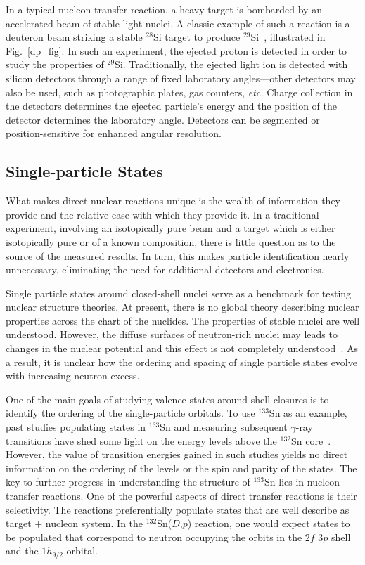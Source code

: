 In a typical nucleon transfer reaction, a heavy target is bombarded by an accelerated beam of stable light nuclei.  A classic example of such a reaction is a deuteron beam striking a stable $^{28}$Si target to produce $^{29}$Si~\cite{Mermaz_1971}, illustrated in Fig.~\ref{dp_fig}.  In such an experiment, the ejected proton is detected in order to study the properties of $^{29}$Si.  Traditionally, the ejected light ion is detected with silicon detectors through a range of fixed laboratory angles---other detectors may also be used, such as photographic plates, gas counters, \textit{etc.}  Charge collection in the detectors determines the ejected particle's energy and the position of the detector determines the laboratory angle.  Detectors can be segmented or position-sensitive for enhanced angular resolution.
 
\subsection{Single-particle States}
What makes direct nuclear reactions unique is the wealth of information they provide and the relative ease with which they provide it.  In a traditional experiment, involving an isotopically pure beam and a target which is either isotopically pure or of a known composition, there is little question as to the source of the measured results.  In turn, this makes particle identification nearly unnecessary, eliminating the need for additional detectors and electronics.

Single particle states around closed-shell nuclei serve as a benchmark for testing nuclear structure theories.  At present, there is no global theory describing nuclear properties across the chart of the nuclides.   The properties of stable nuclei are well understood.  However, the diffuse surfaces of neutron-rich nuclei may leads to changes in the nuclear potential and this effect is not completely understood~\cite{Dobaczewski_1994,Grawe_2005}.  As a result, it is unclear how the ordering and spacing of single particle states evolve with increasing neutron excess.

One of the main goals of studying valence states around shell closures is to identify the ordering of the single-particle orbitals.  To use $^{133}$Sn as an example, past studies populating states in $^{133}$Sn   and measuring subsequent $\gamma$-ray transitions have shed some light on the energy levels above the $^{132}$Sn core~\cite{Hoff_1996,Urban_1999}.  However, the value of transition energies gained in such studies yields no direct information on the ordering of the levels or the spin and parity of the states.  The key to further progress in understanding the structure of $^{133}$Sn lies in nucleon-transfer reactions.  One of the powerful aspects of direct transfer reactions is their selectivity.  The reactions preferentially populate states that are well describe as target $+$ nucleon system.  In the $^{132}$Sn($D$,$p$) reaction, one would expect states to be populated that correspond to neutron occupying the orbits in the $2f$ $3p$ shell and the $1h_{9/2}$ orbital. 

